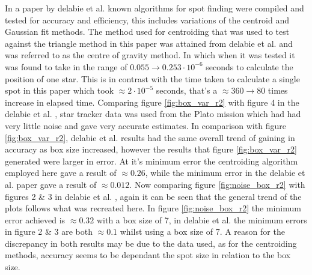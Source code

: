 \documentclass[aps,pra,a4paper,nofootinbib,onecolumn,tightenlines,longbibliography,12pt,amsfonts,amssymb,amsmath,floatfix]{revtex4-2} %
\begin{document}
  In a paper by delabie et al. \cite{delabie2014accurate} known algorithms for spot finding were compiled 
  and tested for accuracy and efficiency, this includes variations of the centroid and Gaussian fit methods.
  The method used for centroiding that was used to test against the triangle method in this paper was attained 
  from delabie et al. \cite{delabie2014accurate} and was referred to as the centre of gravity method. In which when 
  it was tested it was found to take in the range of $0.055\rightarrow 0.253\cdot 10^{-6}$ seconds to calculate 
  the position of one star. This is in contrast with the time taken to calculate a single spot in this paper which 
  took $\approx 2\cdot 10^{-5}$ seconds, that's a $\approx 360\rightarrow 80$ times increase in elapsed 
  time. Comparing figure \ref{fig:box_var_r2} with figure 4 in the delabie et al. \cite{delabie2014accurate},
  star tracker data was used from the Plato mission which had had very little noise and gave very accurate estimates. 
  In comparison with figure \ref{fig:box_var_r2}, delabie et al. results had the same overall trend of gaining in accuracy 
  as box size increased, however the results that figure \ref{fig:box_var_r2} generated were larger in error. At it's 
  minimum error the centroiding algorithm employed here gave a result of $\approx 0.26$, while the minimum error 
  in the delabie et al. paper gave a result of $\approx 0.012$. 
  Now comparing figure \ref{fig:noise_box_r2} with figures 2 \& 3 in delabie et al. \cite{delabie2014accurate}, again 
  it can be seen that the general trend of the plots follows what was recreated here. In figure \ref{fig:noise_box_r2} 
  the minimum error achieved is $\approx 0.32$ with a box size of 7, in delabie et al. the minimum errors in figure 
  2 \& 3 are both $\approx 0.1$ whilst using a box size of 7. A reason for the discrepancy in both results may be due 
  to the data used, as for the centroiding methods, accuracy seems to be dependant the spot size in relation to the 
  box size. 
\end{document}
